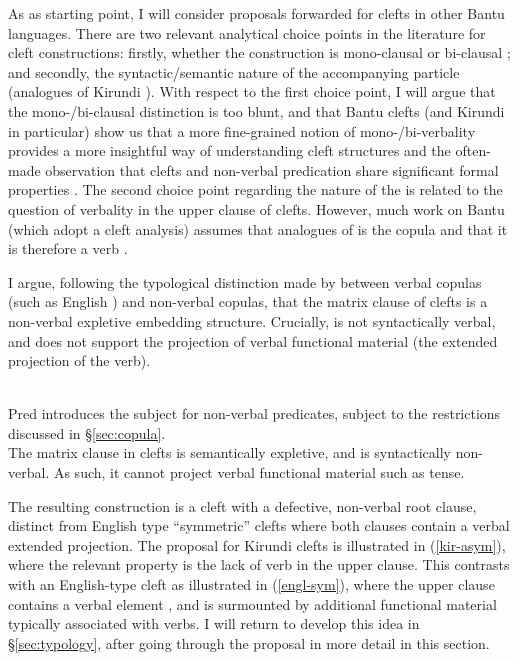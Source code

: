 \documentclass[12pt]{article}
\begin{document}

As as starting point, I will consider proposals forwarded for clefts in other Bantu languages. There are two relevant analytical choice points in the literature for cleft constructions: firstly, whether the construction is mono-clausal or bi-clausal \citep{zentz-2016ho}; and secondly, the syntactic/semantic nature of the accompanying particle (analogues of Kirundi ). With respect to the first choice point, I will argue that the mono-/bi-clausal distinction is too blunt, and that Bantu clefts (and Kirundi in particular) show us that a more fine-grained notion of mono-/bi-verbality provides a more insightful way of understanding cleft structures and the often-made observation that clefts and non-verbal predication share significant formal properties \citep{green-2007}. The second choice point regarding the nature of the  is related to the question of verbality in the upper clause of clefts. However, much work on Bantu (which adopt a cleft analysis) assumes that analogues of  is the copula and that it is therefore a verb \citep{zentz-2016ho,zentz-2016}. 

I argue, following the typological distinction made by \citet{pustet-2003} between verbal copulas (such as English ) and non-verbal copulas, that the matrix clause of clefts is a non-verbal expletive embedding structure. Crucially,  is not syntactically verbal, and does not support the projection of verbal functional material (the extended projection of the verb).

\bex
\ex {}\\
Pred introduces the subject for non-verbal predicates, subject to the restrictions discussed in \S\ref{sec:copula}.
\ex {}\\
The matrix clause in clefts is semantically expletive, and is syntactically non-verbal. As such, it cannot project verbal functional material such as tense. 
\fex

The resulting construction is a cleft with a defective, non-verbal root clause, distinct from English type ``symmetric'' clefts where both clauses contain a verbal extended projection. The proposal for Kirundi clefts is illustrated in (\ref{kir-asym}), where the relevant property is the lack of verb in the upper clause. This contrasts with an English-type cleft as illustrated in (\ref{engl-sym}), where the upper clause contains a verbal element , and is surmounted by additional functional material typically associated with verbs. I will return to develop this idea in \S\ref{sec:typology}, after going through the proposal in more detail in this section. 
\end{document}
